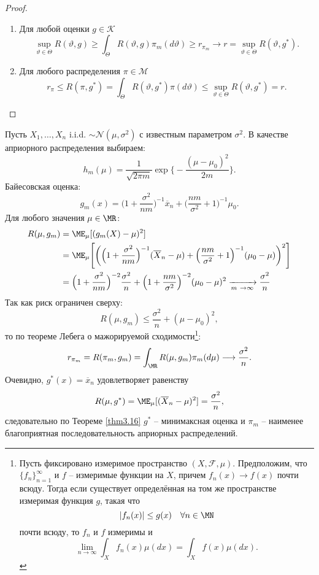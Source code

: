 \begin{proof} \
	\begin{enumerate}
		\item Для любой оценки $g \in \mathcal{K}$
		\[ \sup_{\vartheta \in \Theta} R(\vartheta, g) \geq \int_{\Theta}R(\vartheta, g)\pi_m(d\vartheta) \geq r_{\pi_m} \longrightarrow r=\sup_{\vartheta \in \Theta}R(\vartheta, g^*). \]
		\item Для любого распределения $\pi \in \mathcal{M}$
		\[ r_\pi \leq R(\pi, g^*)=\int_{\Theta} R(\vartheta, g^*) \pi(d \vartheta) \leq \sup_{\vartheta \in \Theta}R(\vartheta, g^*)=r. \]
	\end{enumerate}
\end{proof}

\begin{exmp}
	Пусть $X_1, \dots, X_n$ i.i.d. $\sim \mathcal{N}(\mu, \sigma^2)$ с известным параметром $\sigma^2$. В качестве априорного распределения выбираем:
	\[ h_m(\mu)=\frac{1}{\sqrt{2 \pi m}} \exp \Big \{ -\frac{(\mu-\mu_0)^2}{2m}\Big \}. \]
	Байесовская оценка:
	\[ g_m(x)=\Big( 1 + \frac{\sigma^2}{n m} \Big)^{-1} \overline{x}_n+\Big( \frac{n m}{\sigma^2}+1 \Big)^{-1} \mu_0.\]
	Для любого значения $\mu \in \MR$:
	\[  
	\begin{aligned}
	R(\mu, g_m) & = \ME_\mu[(g_m(X)-\mu)^2] \\
	& = \ME_\mu\Bigg[\bigg(\Big( 1 + \frac{\sigma^2}{n m} \Big)^{-1} (\overline{X}_n-\mu)+\Big( \frac{n m}{\sigma^2}+1 \Big)^{-1} (\mu_0-\mu)\bigg)^2\Bigg] \\
	& = \Big(1 + \frac{\sigma^2}{nm}\Big)^{-2} \frac{\sigma^2}{n} + \Big( 1+\frac{nm}{\sigma^2} \Big)^{-2}(\mu_0-\mu)^2 \xrightarrow[m \ \rightarrow \infty]{} \frac{\sigma^2}{n}
	\end{aligned}
	\]
	Так как риск ограничен сверху:
	\[ R(\mu, g_m) \leq \frac{\sigma^2}{n} + (\mu - \mu_0)^2, \]
	то по теореме Лебега о мажорируемой сходимости\footnote{
		Пусть фиксировано измеримое пространство $(X, \mathcal{F}, \mu)$. Предположим, что $\{ f_n \}_{n=1}^\infty$ и $f$ -- измеримые функции на $X$, причем $f_n(x) \rightarrow f(x)$ почти всюду. Тогда если существует определённая на том же пространстве измеримая функция $g$, такая что
		\[ |f_n(x)| \leq g(x) \quad \forall n \in \MN \]
		почти всюду, то $f_n$ и $f$ измеримы и
		\[ \lim\limits_{n \rightarrow \infty} \int_X f_n(x) \mu(dx) = \int_X f(x) \mu(dx). \]
		}:
	\[ r_{\pi_m}=R(\pi_m, g_m)=\int_{\MR}R(\mu, g_m)\pi_m(d\mu) \longrightarrow \frac{\sigma^2}{n}. \]
	Очевидно, $g^*(x)=\overline{x}_n$ удовлетворяет равенству
	\[ R(\mu, g^*)=\ME_\mu[(\overline{X}_n-\mu)^2]=\frac{\sigma^2}{n}, \]
	следовательно по Теореме \ref{thm3.16} $g^*$ -- минимаксная оценка и $\pi_m$ -- наименее благоприятная последовательность априорных распределений.
\end{exmp}

